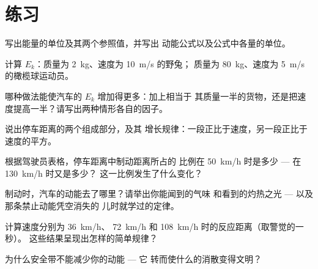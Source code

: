 \section{练习}

\begin{exercise}[$\star$]\label{exo:g9:kinetic-energy-safety:1}
写出能量的单位及其两个参照值，并写出
动能公式以及公式中各量的单位。
\end{exercise}

\begin{exercise}[$\star$]\label{exo:g9:kinetic-energy-safety:2}
计算 $E_k$：质量为 \qty{2}{kg}、速度为 \qty{10}{m/s} 的野兔；
质量为 \qty{80}{kg}、速度为 \qty{5}{m/s} 的橄榄球运动员。
\end{exercise}

\begin{exercise}[$\star$]\label{exo:g9:kinetic-energy-safety:3}
哪种做法能使汽车的 $E_k$ 增加得更多：加上相当于
其质量一半的货物，还是把速度提高一半？请写出两种情形各自的因子。
\end{exercise}

\begin{exercise}[$\star$]\label{exo:g9:kinetic-energy-safety:4}
说出停车距离的两个组成部分，及其
增长规律：一段正比于速度，另一段正比于速度的平方。
\end{exercise}

\begin{exercise}[$\star$]\label{exo:g9:kinetic-energy-safety:5}
根据驾驶员表格，停车距离中制动距离所占的
比例在 \qty{50}{km/h} 时是多少 --- 在 \qty{130}{km/h} 时又是多少？
这一比例发生了什么变化？
\end{exercise}

\begin{exercise}[$\star$]\label{exo:g9:kinetic-energy-safety:6}
制动时，汽车的动能去了哪里？请举出你能闻到的气味
和看到的灼热之光 --- 以及那条禁止动能凭空消失的
儿时就学过的定律。
\end{exercise}

\begin{exercise}[$\star$]\label{exo:g9:kinetic-energy-safety:7}
计算速度分别为 \qty{36}{km/h}、
\qty{72}{km/h} 和 \qty{108}{km/h} 时的反应距离（取警觉的一秒）。
这些结果呈现出怎样的简单规律？
\end{exercise}

\begin{exercise}[$\star$]\label{exo:g9:kinetic-energy-safety:8}
为什么安全带不能减少你的动能 --- 它
转而使什么的消散变得文明？
\end{exercise}

